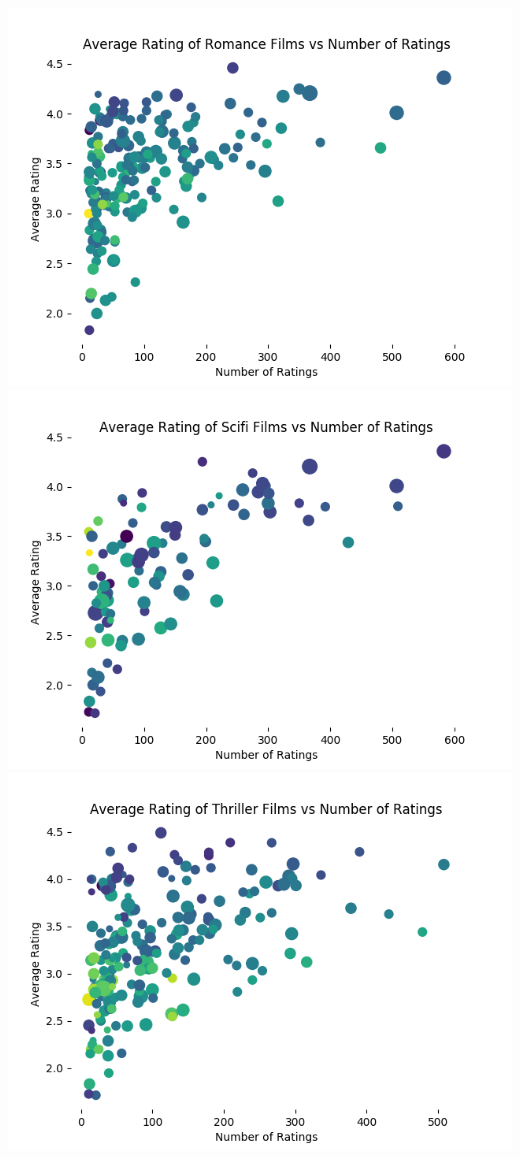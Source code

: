 \documentclass[titlepage]{article}
\begin{document}
\begin{center}
    \includegraphics[width=\textwidth]{basic_4_romance.png} \\
    \includegraphics[width=\textwidth]{basic_4_scifi.png} \\
    \includegraphics[width=\textwidth]{basic_4_thriller.png} \\

\end{center}
\end{document}
